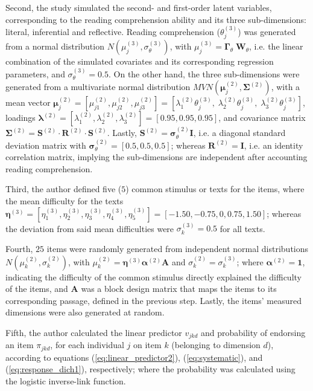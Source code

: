 Second, the study simulated the second- and first-order latent variables, corresponding to the reading comprehension ability and its three sub-dimensions: literal, inferential and reflective. Reading comprehension ($\theta^{(3)}_{j}$) was generated from a normal distribution $N( \mu^{(3)}_{j}, \sigma^{(3)}_{\theta} )$, with $\mu^{(3)}_{j} = \pmb{\Gamma}_{\theta} \; \mathbf{W}_{\theta}$, i.e. the linear combination of the simulated covariates and its corresponding regression parameters, and $\sigma^{(3)}_{\theta}=0.5$. On the other hand, the three sub-dimensions were generated from a multivariate normal distribution $MVN( \pmb{\mu}^{(2)}_{j} , \pmb{\Sigma}^{(2)})$, with a mean vector $\pmb{\mu}^{(2)}_{j} = [\mu^{(2)}_{j1}, \mu^{(2)}_{j2}, \mu^{(2)}_{j3}] = [\lambda^{(2)}_{1} \theta^{(3)}_{j}, \; \lambda^{(2)}_{2} \theta^{(3)}_{j}, \; \lambda^{(2)}_{3} \theta^{(3)}_{j} ]$, loadings $\pmb{\lambda}^{(2)} = [\lambda^{(2)}_{1}, \lambda^{(2)}_{2}, \lambda^{(2)}_{3}] = [0.95, 0.95, 0.95]$, and covariance matrix $\pmb{\Sigma}^{(2)} = \mathbf{S}^{(2)} \cdot \mathbf{R}^{(2)} \cdot \mathbf{S}^{(2)}$. Lastly, $\mathbf{S}^{(2)} = \pmb{\sigma}^{(2)}_{\theta} \mathbf{I}$, i.e. a diagonal standard deviation matrix with $\pmb{\sigma}^{(2)}_{\theta} = [0.5, 0.5, 0.5]$; whereas $\mathbf{R}^{(2)} = \mathbf{I}$, i.e. an identity correlation matrix, implying the sub-dimensions are independent after accounting reading comprehension.

Third, the author defined five ($5$) common stimulus or texts for the items, where the mean difficulty for the texts $\pmb{\eta}^{(3)} = [\eta^{(3)}_{1}, \eta^{(3)}_{2}, \eta^{(3)}_{3}, \eta^{(3)}_{4}, \eta^{(3)}_{5}] = [-1.50, -0.75, 0, 0.75, 1.50]$; whereas the deviation from said mean difficulties were $\sigma^{(3)}_{k} = 0.5$ for all texts. 

Fourth, $25$ items were randomly generated from independent normal distributions $N( \mu^{(2)}_{k}, \sigma^{(2)}_{k} ) $, with $\mu^{(2)}_{k} = \pmb{\eta}^{(3)} \pmb{\alpha}^{(2)} \mathbf{A}$ and $\sigma^{(2)}_{k} = \sigma^{(3)}_{k}$; where $\pmb{\alpha}^{(2)} = \mathbf{1}$, indicating the difficulty of the common stimulus directly explained the difficulty of the items, and $\mathbf{A}$ was a block design matrix that maps the items to its corresponding passage, defined in the previous step. Lastly, the items' measured dimensions were also generated at random.

Fifth, the author calculated the linear predictor $v_{jkd}$ and probability of endorsing an item $\pi_{jkd}$, for each individual $j$ on item $k$ (belonging to dimension $d$), according to equations (\ref{eq:linear_predictor2}), (\ref{eq:systematic}), and (\ref{eq:response_dich1}), respectively; where the probability was calculated using the logistic inverse-link function.
	
